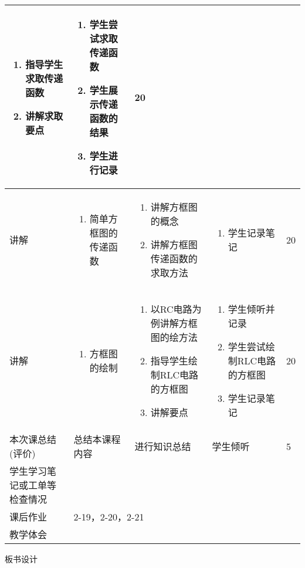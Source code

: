 {\begin{landscape}
\begin{longtable}{|m{10mm}|m{50mm}|m{50mm}|m{50mm}|m{15mm}|}
\begin{enumerate}
\item 指导学生求取传递函数
\item 讲解求取要点
\end{enumerate} &\begin{enumerate}
\item 学生尝试求取传递函数
\item 学生展示传递函数的结果
\item 学生进行记录
\end{enumerate} &20 \\\hline
讲解&\begin{enumerate}
\item 简单方框图的传递函数
\end{enumerate}
 &\begin{enumerate}
\item 讲解方框图的概念
\item 讲解方框图传递函数的求取方法
\end{enumerate} &\begin{enumerate}
\item 学生记录笔记
\end{enumerate} &20 \\\hline
讲解&
\begin{enumerate}
\item 方框图的绘制
\end{enumerate}
 &\begin{enumerate}
\item 以RC电路为例讲解方框图的绘方法
\item 指导学生绘制RLC电路的方框图
\item 讲解要点
\end{enumerate} &\begin{enumerate}
\item 学生倾听并记录
\item 学生尝试绘制RLC电路的方框图
\item 学生记录笔记
\end{enumerate} &20 \\\hline
\centering 本次课总结(评价)&总结本课程内容 &进行知识总结 &学生倾听 &5 \\\hline
\centering 学生学习笔记或工单等检查情况&\multicolumn{4}{m{165mm}|}{\quad}\\\hline
\centering 课后作业&\multicolumn{4}{m{165mm}|}{2-19，2-20，2-21}\\\hline
\centering 教学体会&\multicolumn{4}{m{165mm}|}{\quad}\\
\end{longtable}

\end{landscape}
\clearpage
\begin{center}
{\huge 板书设计}
\end{center}
}
